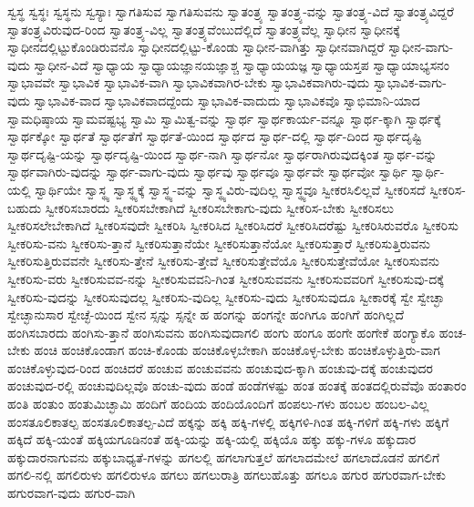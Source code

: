 {ಸ್ವಸ್ಥ
ಸ್ವಸ್ಥಃ
ಸ್ವಸ್ಥನು
ಸ್ವಸ್ಯಾಃ
ಸ್ವಾಗತಿಸುವ
ಸ್ವಾಗತಿಸುವನು
ಸ್ವಾತಂತ್ರ್ಯ
ಸ್ವಾತಂತ್ರ್ಯ-ವನ್ನು
ಸ್ವಾತಂತ್ರ್ಯ-ವಿದೆ
ಸ್ವಾತಂತ್ರ್ಯವಿದ್ದರೆ
ಸ್ವಾತಂತ್ರ್ಯವಿರುವುದ-ರಿಂದ
ಸ್ವಾತಂತ್ರ್ಯ-ವಿಲ್ಲ
ಸ್ವಾತಂತ್ರ್ಯವೆಂಬುದೆಲ್ಲಿದೆ
ಸ್ವಾತಂತ್ರ್ಯವೆಲ್ಲ
ಸ್ವಾಧೀನ
ಸ್ವಾಧೀನಕ್ಕೆ
ಸ್ವಾಧೀನದಲ್ಲಿಟ್ಟುಕೊಂಡಿರುವನೊ
ಸ್ವಾಧೀನದಲ್ಲಿಟ್ಟು-ಕೊಂಡು
ಸ್ವಾಧೀನ-ವಾಗಿತ್ತು
ಸ್ವಾಧೀನವಾಗಿದ್ದರೆ
ಸ್ವಾಧೀನ-ವಾಗು-ವುದು
ಸ್ವಾಧೀನ-ವಿದೆ
ಸ್ವಾಧ್ಯಾಯ
ಸ್ವಾಧ್ಯಾಯಜ್ಞಾನಯಜ್ಞಾಶ್ಚ
ಸ್ವಾಧ್ಯಾಯಯಜ್ಞ
ಸ್ವಾಧ್ಯಾಯಸ್ತಪ
ಸ್ವಾಧ್ಯಾಯಾಭ್ಯಸನಂ
ಸ್ವಾಭಾವವೇ
ಸ್ವಾಭಾವಿಕ
ಸ್ವಾಭಾವಿಕ-ವಾಗಿ
ಸ್ವಾಭಾವಿಕವಾಗಿರ-ಬೇಕು
ಸ್ವಾಭಾವಿಕವಾಗಿರು-ವುದು
ಸ್ವಾಭಾವಿಕ-ವಾಗು-ವುದು
ಸ್ವಾಭಾವಿಕ-ವಾದ
ಸ್ವಾಭಾವಿಕವಾದದ್ದೆಂದು
ಸ್ವಾಭಾವಿಕ-ವಾದುದು
ಸ್ವಾಭಾವಿಕವೊ
ಸ್ವಾಭಿಮಾನಿ-ಯಾದ
ಸ್ವಾಮಧಿಷ್ಠಾಯ
ಸ್ವಾಮವಷ್ಟಭ್ಯ
ಸ್ವಾಮಿ
ಸ್ವಾಮಿತ್ವ-ವನ್ನು
ಸ್ವಾರ್ಥ
ಸ್ವಾರ್ಥಕಾರ್ಯ-ವನ್ನೂ
ಸ್ವಾರ್ಥ-ಕ್ಕಾಗಿ
ಸ್ವಾರ್ಥಕ್ಕೆ
ಸ್ವಾರ್ಥಕ್ಕೋ
ಸ್ವಾರ್ಥತೆ
ಸ್ವಾರ್ಥತೆಗೆ
ಸ್ವಾರ್ಥತೆ-ಯಿಂದ
ಸ್ವಾರ್ಥದ
ಸ್ವಾರ್ಥ-ದಲ್ಲಿ
ಸ್ವಾರ್ಥ-ದಿಂದ
ಸ್ವಾರ್ಥದೃಷ್ಟಿ
ಸ್ವಾರ್ಥದೃಷ್ಟಿ-ಯನ್ನು
ಸ್ವಾರ್ಥದೃಷ್ಟಿ-ಯಿಂದ
ಸ್ವಾರ್ಥ-ನಾಗಿ
ಸ್ವಾರ್ಥನೋ
ಸ್ವಾರ್ಥರಾಗಿರುವುದಕ್ಕಿಂತ
ಸ್ವಾರ್ಥ-ವನ್ನು
ಸ್ವಾರ್ಥವಾಗಿರು-ವುದನ್ನು
ಸ್ವಾರ್ಥ-ವಾಗು-ವುದು
ಸ್ವಾರ್ಥವು
ಸ್ವಾರ್ಥವೂ
ಸ್ವಾರ್ಥವೇ
ಸ್ವಾರ್ಥವೋ
ಸ್ವಾರ್ಥಿ
ಸ್ವಾರ್ಥಿ-ಯಲ್ಲಿ
ಸ್ವಾರ್ಥಿಯೇ
ಸ್ವಾಸ್ಥ್ಯ
ಸ್ವಾಸ್ಥ್ಯಕ್ಕೆ
ಸ್ವಾಸ್ಥ್ಯ-ವನ್ನು
ಸ್ವಾಸ್ಥ್ಯವಿರು-ವುದಿಲ್ಲ
ಸ್ವಾಸ್ಥ್ಯವೂ
ಸ್ವೀಕರಸಿಲಿಲ್ಲವೆ
ಸ್ವೀಕರಿಸದೆ
ಸ್ವೀಕರಿಸ-ಬಹುದು
ಸ್ವೀಕರಿಸಬಾರದು
ಸ್ವೀಕರಿಸಬೇಕಾಗಿದೆ
ಸ್ವೀಕರಿಸಬೇಕಾಗು-ವುದು
ಸ್ವೀಕರಿಸ-ಬೇಕು
ಸ್ವೀಕರಿಸಲು
ಸ್ವೀಕರಿಸಲೇಬೇಕಾಗಿದೆ
ಸ್ವೀಕರಿಸವುದೇ
ಸ್ವೀಕರಿಸಿ
ಸ್ವೀಕರಿಸಿದ
ಸ್ವೀಕರಿಸಿದರೆ
ಸ್ವೀಕರಿಸಿದರೆಷ್ಟು
ಸ್ವೀಕರಿಸಿರುವರೊ
ಸ್ವೀಕರಿಸು
ಸ್ವೀಕರಿಸು-ವನು
ಸ್ವೀಕರಿಸು-ತ್ತಾನೆ
ಸ್ವೀಕರಿಸುತ್ತಾನೆಯೇ
ಸ್ವೀಕರಿಸುತ್ತಾನೆಯೋ
ಸ್ವೀಕರಿಸುತ್ತಾರೆ
ಸ್ವೀಕರಿಸುತ್ತಿರುವನು
ಸ್ವೀಕರಿಸುತ್ತಿರುವವನೇ
ಸ್ವೀಕರಿಸು-ತ್ತೇನೆ
ಸ್ವೀಕರಿಸು-ತ್ತೇವೆ
ಸ್ವೀಕರಿಸುತ್ತೇವೆಯೊ
ಸ್ವೀಕರಿಸುತ್ತೇವೆಯೋ
ಸ್ವೀಕರಿಸುವನು
ಸ್ವೀಕರಿಸು-ವರು
ಸ್ವೀಕರಿಸುವವ-ನನ್ನು
ಸ್ವೀಕರಿಸುವವನಿ-ಗಿಂತ
ಸ್ವೀಕರಿಸುವವನು
ಸ್ವೀಕರಿಸುವವರಿಗೆ
ಸ್ವೀಕರಿಸುವು-ದಕ್ಕೆ
ಸ್ವೀಕರಿಸು-ವುದನ್ನು
ಸ್ವೀಕರಿಸುವುದಲ್ಲ
ಸ್ವೀಕರಿಸು-ವುದಿಲ್ಲ
ಸ್ವೀಕರಿಸು-ವುದು
ಸ್ವೀಕರಿಸುವುದೂ
ಸ್ವೀಕಾರಕ್ಕೆ
ಸ್ವೇ
ಸ್ವೇಚ್ಛಾ
ಸ್ವೇಚ್ಛಾನುಸಾರ
ಸ್ವೇಚ್ಛೆ-ಯಿಂದ
ಸ್ವೇನ
ಸ್ಸನ್ನು
ಸ್ಸನ್ನೇ
ಹ
ಹಂಗನ್ನು
ಹಂಗನ್ನೇ
ಹಂಗಿಗೂ
ಹಂಗಿಗೆ
ಹಂಗಿಲ್ಲದೆ
ಹಂಗಿಸಬಾರದು
ಹಂಗಿಸು-ತ್ತಾನೆ
ಹಂಗಿಸುವನು
ಹಂಗಿಸುವುದಾಗಲಿ
ಹಂಗು
ಹಂಗೂ
ಹಂಗೇ
ಹಂಗೇಕೆ
ಹಂಗ್ಯಾಕೊ
ಹಂಚ-ಬೇಕು
ಹಂಚಿ
ಹಂಚಿಕೊಂಡಾಗ
ಹಂಚಿ-ಕೊಂಡು
ಹಂಚಿಕೊಳ್ಳಬೇಕಾಗಿ
ಹಂಚಿಕೊಳ್ಳ-ಬೇಕು
ಹಂಚಿಕೊಳ್ಳುತ್ತಿರು-ವಾಗ
ಹಂಚಿಕೊಳ್ಳುವುದ-ರಿಂದ
ಹಂಚಿದರೆ
ಹಂಚುವ
ಹಂಚುವವನು
ಹಂಚುವುದ-ಕ್ಕಾಗಿ
ಹಂಚುವು-ದಕ್ಕೆ
ಹಂಚುವುದರ
ಹಂಚುವುದ-ರಲ್ಲಿ
ಹಂಚುವುದಿಲ್ಲವೊ
ಹಂಚು-ವುದು
ಹಂಡೆ
ಹಂಡೆಗಳಷ್ಟು
ಹಂತ
ಹಂತಕ್ಕೆ
ಹಂತದಲ್ಲಿರುವೆವೊ
ಹಂತಾರಂ
ಹಂತಿ
ಹಂತುಂ
ಹಂತುಮಿಚ್ಛಾಮಿ
ಹಂದಿಗೆ
ಹಂದಿಯ
ಹಂದಿಯೊಂದಿಗೆ
ಹಂಪಲು-ಗಳು
ಹಂಬಲ
ಹಂಬಲ-ವಿಲ್ಲ
ಹಂಸತೂಲಿಕಾತಲ್ಪ
ಹಂಸತೂಲಿಕಾತಲ್ಪ-ವಿದೆ
ಹಕ್ಕನ್ನು
ಹಕ್ಕಿ
ಹಕ್ಕಿ-ಗಳಲ್ಲಿ
ಹಕ್ಕಿಗಳಿ-ಗಿಂತ
ಹಕ್ಕಿ-ಗಳಿಗೆ
ಹಕ್ಕಿ-ಗಳು
ಹಕ್ಕಿಗೆ
ಹಕ್ಕಿದೆ
ಹಕ್ಕಿ-ಯಂತೆ
ಹಕ್ಕಿಯಗೂಡಿನಂತೆ
ಹಕ್ಕಿ-ಯನ್ನು
ಹಕ್ಕಿ-ಯಲ್ಲಿ
ಹಕ್ಕಿಯೊ
ಹಕ್ಕು
ಹಕ್ಕು-ಗಳೂ
ಹಕ್ಕುದಾರ
ಹಕ್ಕುದಾರನಾಗುವನು
ಹಕ್ಕುಬಾಧ್ಯತೆ-ಗಳನ್ನು
ಹಗಲಲ್ಲಿ
ಹಗಲಾಗುತ್ತಲೆ
ಹಗಲಾದಮೇಲೆ
ಹಗಲಾದೊಡನೆ
ಹಗಲಿಗೆ
ಹಗಲಿ-ನಲ್ಲಿ
ಹಗಲಿರುಳು
ಹಗಲಿರುಳೂ
ಹಗಲು
ಹಗಲುರಾತ್ರಿ
ಹಗಲುಹೊತ್ತು
ಹಗಲೂ
ಹಗುರ
ಹಗುರವಾಗ-ಬೇಕು
ಹಗುರವಾಗ-ವುದು
ಹಗುರ-ವಾಗಿ
}
